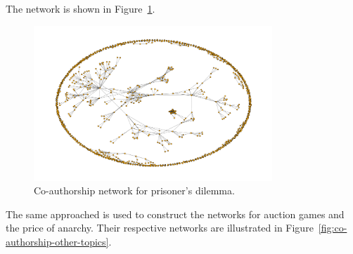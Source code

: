 \documentclass{article}
\begin{document}
The network is shown in Figure~\ref{fig:authors_network}.

\begin{figure}[!hbtp]
    \centering
    \includegraphics[width=0.8\textwidth]{./assets/images/co-authors-network.pdf}
    \caption{Co-authorship network for prisoner's dilemma.}\label{fig:authors_network}
\end{figure}

The same approached is used to construct the networks for auction games and the
price of anarchy. Their respective networks are illustrated in Figure~\ref{fig:co-authorship-other-topics}.
\end{document}
